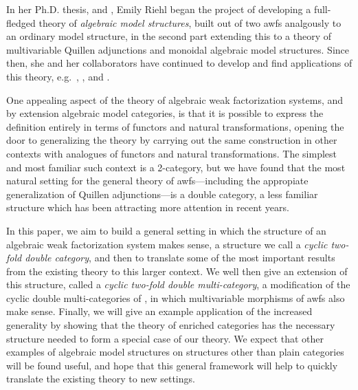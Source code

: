 In her Ph.D. thesis, \cite{riehl:nwfs-model} and \cite{riehl:nwfs-monoidal}, Emily Riehl began the project of developing a full-fledged theory of \emph{algebraic model structures}, built out of two awfs analgously to an ordinary model structure, in the second part extending this to a theory of multivariable Quillen adjunctions and monoidal algebraic model structures. Since then, she and her collaborators have continued to develop and find applications of this theory, e.g.~\cite{cgr:mates}, \cite{br:funct-facts}, and \cite{bmr:six}.

One appealing aspect of the theory of algebraic weak factorization systems, and by extension algebraic model categories, is that it is possible to express the definition entirely in terms of functors and natural transformations, opening the door to generalizing the theory by carrying out the same construction in other contexts with analogues of functors and natural transformations. The simplest and most familiar such context is a 2-category, but we have found that the most natural setting for the general theory of awfs---including the appropiate generalization of Quillen adjunctions---is a double category, a less familiar structure which has been attracting more attention in recent years. %

In this paper, we aim to build a general setting in which the structure of an algebraic weak factorization system makes sense, a structure we call a \emph{cyclic two-fold double category}, and then to translate some of the most important results from the existing theory to this larger context. We well then give an extension of this structure, called a \emph{cyclic two-fold double multi-category}, a modification of the cyclic double multi-categories of \cite{cgr:mates}, in which multivariable morphisms of awfs also make sense. Finally, we will give an example application of the increased generality by showing that the theory of enriched categories has the necessary structure needed to form a special case of our theory. We expect that other examples of algebraic model structures on structures other than plain categories will be found useful, and hope that this general framework will help to quickly translate the existing theory to new settings.